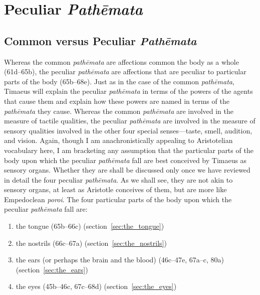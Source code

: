 
\chapter{Peculiar \emph{Pathēmata}} %
\label{cha:peculiar_pathemata}

\section{Common versus Peculiar \emph{Pathēmata}} %
\label{sec:common_versus_peculiar_pathemata}

Whereas the common \emph{pathēmata} are affections common the body as a whole (61d--65b), the peculiar \emph{pathēmata} are affections that are peculiar to particular parts of the body (65b--68e). Just as in the case of the common \emph{pathēmata}, Timaeus will explain the peculiar \emph{pathēmata} in terms of the powers of the agents that cause them and explain how these powers are named in terms of the \emph{pathēmata} they cause. Whereas the common \emph{pathēmata} are involved in the measure of tactile qualities, the peculiar \emph{pathēmata} are involved in the measure of sensory qualities involved in the other four special senses---taste, smell, audition, and vision. Again, though I am anachronistically appealing to Aristotelian vocabulary here, I am bracketing any assumption that the particular parts of the body upon which the peculiar \emph{pathēmata} fall are best conceived by Timaeus as sensory organs. Whether they are shall be discussed only once we have reviewed in detail the four peculiar \emph{pathēmata}. As we shall see, they are not akin to sensory organs, at least as Aristotle conceives of them, but are more like Empedoclean \emph{poroi}. The four particular parts of the body upon which the peculiar \emph{pathēmata} fall are:
\begin{enumerate}
	\item the tongue (65b--66c) (section~\ref{sec:the_tongue})
	\item the nostrils (66c--67a) (section~\ref{sec:the_nostrils})
	\item the ears (or perhaps the brain and the blood) (46c--47e, 67a--c, 80a) (section~\ref{sec:the_ears})
	\item the eyes (45b--46c, 67c--68d) (section~\ref{sec:the_eyes})
\end{enumerate} 

